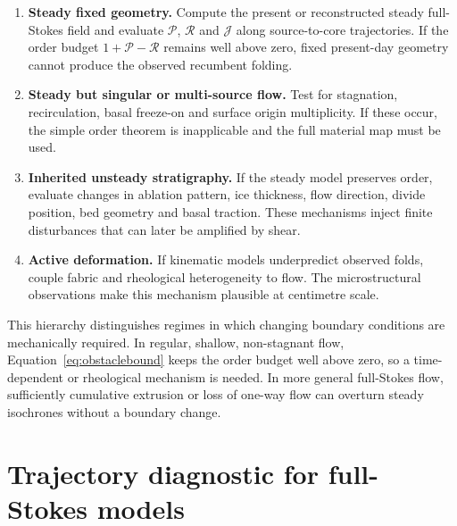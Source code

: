 \documentclass[review]{igs}
\theoremstyle{definition}
\theoremstyle{remark}
\newcommand{\Rpos}{\mathcal{P}}
\newcommand{\Rneg}{\mathcal{R}}
\newcommand{\Jord}{\mathcal{J}}
\begin{document}
\begin{enumerate}[leftmargin=*,label=(\arabic*)]
  \item \textbf{Steady fixed geometry.} Compute the present or reconstructed steady full-Stokes field and evaluate \(\Rpos\), \(\Rneg\) and \(\Jord\) along source-to-core trajectories. If the order budget \(1+\Rpos-\Rneg\) remains well above zero, fixed present-day geometry cannot produce the observed recumbent folding.
  \item \textbf{Steady but singular or multi-source flow.} Test for stagnation, recirculation, basal freeze-on and surface origin multiplicity. If these occur, the simple order theorem is inapplicable and the full material map must be used.
  \item \textbf{Inherited unsteady stratigraphy.} If the steady model preserves order, evaluate changes in ablation pattern, ice thickness, flow direction, divide position, bed geometry and basal traction. These mechanisms inject finite disturbances that can later be amplified by shear.
  \item \textbf{Active deformation.} If kinematic models underpredict observed folds, couple fabric and rheological heterogeneity to flow. The microstructural observations make this mechanism plausible at centimetre scale.
\end{enumerate}

This hierarchy distinguishes regimes in which changing boundary conditions are mechanically required. In regular, shallow, non-stagnant flow, Equation~\eqref{eq:obstaclebound} keeps the order budget well above zero, so a time-dependent or rheological mechanism is needed. In more general full-Stokes flow, sufficiently cumulative extrusion or loss of one-way flow can overturn steady isochrones without a boundary change.

\section{Trajectory diagnostic for full-Stokes models}
\end{document}
